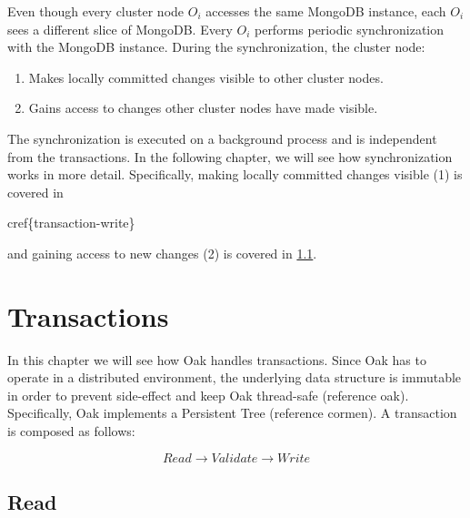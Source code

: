 \documentclass[abstracton,12pt]{scrreprt}
\begin{document}
Even though every cluster node $O_i$ accesses the same MongoDB instance,
each $O_i$ sees a different slice of MongoDB.
Every $O_i$ performs periodic synchronization with the MongoDB instance.
During the synchronization, the cluster node:
\begin{enumerate}
    \item Makes locally committed changes visible to other cluster nodes.
    \item Gains access to changes other cluster nodes have made visible.
\end{enumerate}

The synchronization is executed on a background process and is independent from the transactions.
In the following chapter, we will see how synchronization works in more detail.
Specifically, making locally committed changes visible (1) is covered in {\huge{cref\{transaction-write\}}\par} and
gaining access to new changes (2) is covered in \cref{transaction-read}.

\section{Transactions}

In this chapter we will see how Oak handles transactions.
Since Oak has to operate in a distributed environment, the underlying data structure is immutable in order to prevent side-effect and keep Oak thread-safe (reference oak).
Specifically, Oak implements a Persistent Tree (reference cormen).
A transaction is composed as follows:

$$
Read \longrightarrow Validate \longrightarrow Write
$$

\subsection{Read} \label{transaction-read}
\end{document}
